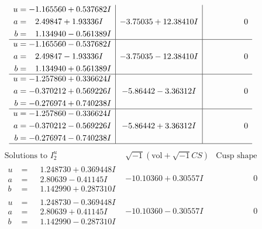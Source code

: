 \documentclass[1p]{elsarticle_modified}
\theoremstyle{definition}
\newcommand{\I}{\sqrt{-1}}
\begin{document}
$$\begin{array}{c|c|c}
\begin{aligned}
u &= -1.165560 + 0.537682 I \\
a &= \phantom{-}2.49847 + 1.93336 I \\
b &= \phantom{-}1.134940 - 0.561389 I\end{aligned}
 & -3.75035 + 12.38410 I & \phantom{-0.000000 } 0 \\ \hline\begin{aligned}
u &= -1.165560 - 0.537682 I \\
a &= \phantom{-}2.49847 - 1.93336 I \\
b &= \phantom{-}1.134940 + 0.561389 I\end{aligned}
 & -3.75035 - 12.38410 I & \phantom{-0.000000 } 0 \\ \hline\begin{aligned}
u &= -1.257860 + 0.336624 I \\
a &= -0.370212 + 0.569226 I \\
b &= -0.276974 + 0.740238 I\end{aligned}
 & -5.86442 - 3.36312 I & \phantom{-0.000000 } 0 \\ \hline\begin{aligned}
u &= -1.257860 - 0.336624 I \\
a &= -0.370212 - 0.569226 I \\
b &= -0.276974 - 0.740238 I\end{aligned}
 & -5.86442 + 3.36312 I & \phantom{-0.000000 } 0\\
 \hline 
 \end{array}$$\newpage$$\begin{array}{c|c|c}  
\text{Solutions to }I^u_{2}& \I (\text{vol} + \sqrt{-1}CS) & \text{Cusp shape}\\
 \hline 
\begin{aligned}
u &= \phantom{-}1.248730 + 0.369448 I \\
a &= \phantom{-}2.80639 - 0.41145 I \\
b &= \phantom{-}1.142990 + 0.287310 I\end{aligned}
 & -10.10360 + 0.30557 I & \phantom{-0.000000 } 0 \\ \hline\begin{aligned}
u &= \phantom{-}1.248730 - 0.369448 I \\
a &= \phantom{-}2.80639 + 0.41145 I \\
b &= \phantom{-}1.142990 - 0.287310 I\end{aligned}
 & -10.10360 - 0.30557 I & \phantom{-0.000000 } 0 \\ \hline\begin{aligned}

\end{aligned}
\end{array}$$
\end{document}
